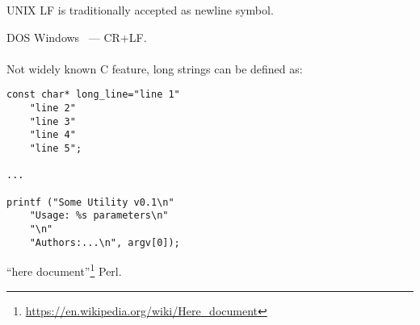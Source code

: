  \AndENRU UNIX 
{LF is traditionally accepted as newline symbol}.

 DOS  Windows ~--- CR+LF.

\paragraph{}
\label{heredoc}
{Not widely known C feature, long strings can be defined as}:

\begin{lstlisting}
const char* long_line="line 1"
	"line 2"
	"line 3"
	"line 4"
	"line 5";

...

printf ("Some Utility v0.1\n"
	"Usage: %s parameters\n"
	"\n"
	"Authors:...\n", argv[0]);
\end{lstlisting}

``here document''\footnote{\url{https://en.wikipedia.org/wiki/Here_document}} 
 \AndENRU Perl.

